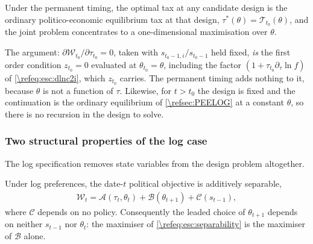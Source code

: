 \begin{proposition}\label{prop:esc:concentration}
Under the permanent timing, the optimal tax at any candidate design is the ordinary politico-economic equilibrium tax at that design, $\tau^{\ast}(\theta) = \mathcal{T}_{t_0}(\theta)$, and the joint problem concentrates to a one-dimensional maximisation over $\theta$.
\end{proposition}

The argument: $\partial\mathcal{W}_{t_0}/\partial\tau_{t_0} = 0$, taken with $s_{t_0-1,i}/s_{t_0-1}$ held fixed, \emph{is} the first order condition $z_{t_0}=0$ evaluated at $\theta_{t_0}=\theta$, including the factor $\left(1+\tau_{t_0}\partial_{\tau}\ln f\right)$ of \eqref{\refeq:esc:dlnc2i}, which $z_{t_0}$ carries. The permanent timing adds nothing to it, because $\theta$ is not a function of $\tau$. Likewise, for $t>t_0$ the design is fixed and the continuation is the ordinary equilibrium of \cref{\refsec:PEELOG} at a constant $\theta$, so there is no recursion in the design to solve.


\subsubsection{Two structural properties of the log case}\label{\refsec:ESC:separability}
The log specification removes state variables from the design problem altogether.

\begin{proposition}\label{prop:esc:separability}
Under log preferences, the date-$t$ political objective is additively separable,
\begin{align}\label{\refeq:esc:separability}
    \mathcal{W}_t = \mathcal{A}\left(\tau_t,\theta_t\right) + \mathcal{B}\left(\theta_{t+1}\right) + \mathcal{C}\left(s_{t-1}\right),
\end{align}
where $\mathcal{C}$ depends on no policy. Consequently the leaded choice of $\theta_{t+1}$ depends on neither $s_{t-1}$ nor $\theta_t$: the maximiser of \eqref{\refeq:esc:separability} is the maximiser of $\mathcal{B}$ alone.
\end{proposition}


